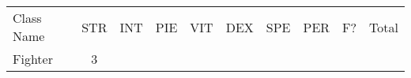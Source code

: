 \documentclass[12pt]{article}
\newcommand{\indexClass}[1]{\index{#1}}
\newcommand{\class}[1]{#1\indexClass{#1}}
\begin{document}
\begin{longtable}[]{@{}|l|c|c|c|c|c|c|c|c|r|@{}}
\toprule
\begin{minipage}[t]{0.13\columnwidth}\raggedright\strut
Class Name
\strut\end{minipage} &
\begin{minipage}[t]{0.06\columnwidth}\raggedright\strut
STR
\strut\end{minipage} &
\begin{minipage}[t]{0.06\columnwidth}\raggedright\strut
INT
\strut\end{minipage} &
\begin{minipage}[t]{0.06\columnwidth}\raggedright\strut
PIE
\strut\end{minipage} &
\begin{minipage}[t]{0.06\columnwidth}\raggedright\strut
VIT
\strut\end{minipage} &
\begin{minipage}[t]{0.06\columnwidth}\raggedright\strut
DEX
\strut\end{minipage} &
\begin{minipage}[t]{0.06\columnwidth}\raggedright\strut
SPE
\strut\end{minipage} &
\begin{minipage}[t]{0.06\columnwidth}\raggedright\strut
PER
\strut\end{minipage} &
\begin{minipage}[t]{0.07\columnwidth}\raggedright\strut
F?
\strut\end{minipage} &
\begin{minipage}[t]{0.08\columnwidth}\raggedright\strut
Total
\strut\end{minipage}\tabularnewline \hhline{|*{10}{=|}}
\begin{minipage}[t]{0.13\columnwidth}\raggedright\strut
\class{Fighter}
\strut\end{minipage} &
\begin{minipage}[t]{0.06\columnwidth}\raggedright\strut
3
\strut\end{minipage} &
\begin{minipage}[t]{0.06\columnwidth}\raggedright\strut
\strut\end{minipage} &
\begin{minipage}[t]{0.06\columnwidth}\raggedright\strut
\strut\end{minipage} &
\begin{minipage}[t]{0.06\columnwidth}\raggedright\strut
\strut\end{minipage} &
\begin{minipage}[t]{0.06\columnwidth}\raggedright\strut

\end{minipage}
\end{longtable}
\end{document}
